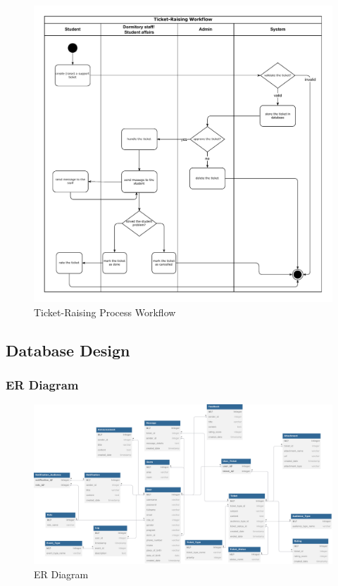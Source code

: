 \begin{figure}[H]
	\centering
	\includegraphics[width=1\columnwidth]{graphics/sys-workflow.pdf}
	\caption{Ticket-Raising Process Workflow}
	\label{fig:ticket-raising-workflow}
\end{figure}


\subsection{Database Design}
	\subsubsection{ER Diagram}
	\begin{figure}[H]
		\centering
		\includegraphics[width=1 \columnwidth]{graphics/er-diagram-v2.pdf}
		\caption{ER Diagram}
		\label{fig:er-diagram}
	\end{figure}


